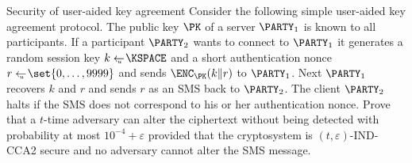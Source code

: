 \documentclass{crypto-exercise}
\author{Sven Laur}
\begin{document}
\begin{exercise}{Security of user-aided key agreement}
Consider the following simple user-aided key agreement protocol. The public key $\PK$ of a server $\PARTY_1$ is known to all participants. If a participant $\PARTY_2$ wants to connect to $\PARTY_1$ it generates a random session key $k\getsu\KSPACE$ and a short authentication nonce $r\getsu\set{0,\ldots,9999}$ and sends $\ENC_\PK(k\|r)$ to $\PARTY_1$. Next $\PARTY_1$ recovers $k$ and $r$ and sends $r$ as an SMS back to $\PARTY_2$. The client $\PARTY_2$ halts if the SMS does not correspond to his or her authentication nonce.
Prove that a $t$-time adversary can alter the ciphertext without being detected with probability at most $10^{-4}+\varepsilon$ provided that the cryptosystem is $(t,\varepsilon)$-IND-CCA2 secure and no adversary cannot alter the SMS message.
\end{exercise}
\end{document}
